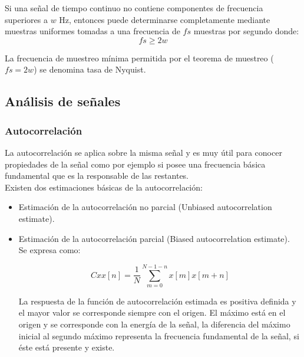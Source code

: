 	Si una señal de tiempo continuo no contiene componentes de frecuencia superiores a $w$ Hz, entonces puede determinarse completamente mediante muestras uniformes tomadas a una frecuencia de $fs$ muestras por segundo donde:
	$$fs \geq 2w$$
	
	La frecuencia de muestreo mínima permitida por el teorema de muestreo ($fs = 2w$) se denomina tasa de Nyquist. \cite{sampling}
	
	\subsection{Análisis de señales}
	
	\subsubsection{Autocorrelación}
	La autocorrelación se aplica sobre la misma señal y es muy útil para conocer propiedades de la señal
	como por ejemplo si posee una frecuencia básica fundamental que es la responsable de las restantes. \\
	
	Existen dos estimaciones básicas de la autocorrelación:
	\begin{itemize}
		\item Estimación de la autocorrelación no parcial (Unbiased autocorrelation estimate).
		\item Estimación de la autocorrelación parcial (Biased autocorrelation estimate). \\
		Se expresa como:
		
		$$Cxx[n] = \frac{1}{N} \sum_{m=0}^{N-1-n}x[m]x[m+n]$$
		
		La respuesta de la función de autocorrelación estimada es positiva definida y el mayor
		valor se corresponde siempre con el origen. El máximo está en el origen y se corresponde con la
		energía de la señal, la diferencia del máximo inicial al segundo máximo representa la frecuencia fundamental de la señal, si éste está presente y existe.
	\end{itemize}


